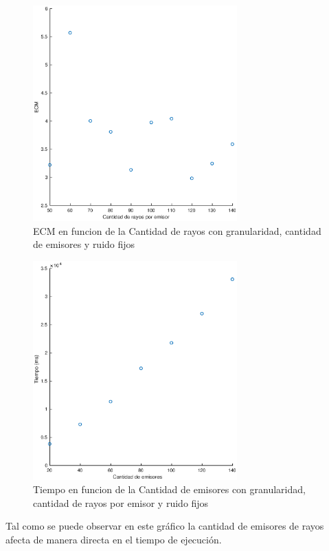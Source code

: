 \begin{figure}[H]
	\centering	\includegraphics[width=0.7\textwidth]{img/cantrayos_ecm}
	\caption{ECM en funcion de la Cantidad de rayos con granularidad, cantidad de emisores y ruido fijos}
	\label{fig:cantrayos_eps}
\end{figure}


\begin{figure}[H]
	\centering	\includegraphics[width=0.7\textwidth]{img/emi_tiempo}
	\caption{Tiempo en funcion de la Cantidad de emisores con granularidad, cantidad de rayos por emisor y ruido fijos}
	\label{fig:emi_tiempo}
\end{figure}
\par Tal como se puede observar en este gr\'afico la cantidad de emisores de rayos afecta de manera directa en el tiempo de ejecuci\'on.

